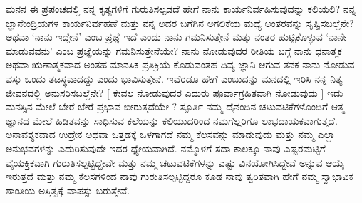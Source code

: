 ಮನನ 
 ಈ ಪ್ರಪಂಚದಲ್ಲಿ ನನ್ನ ಕೃತ್ಯಗಳಿಗೆ ಗುರುತಿಸಲ್ಪಡದೆ ಹೇಗೆ ನಾನು ಕಾರ್ಯನಿರ್ವಹಿಸುವುದನ್ನು ಕಲಿಯಲಿ? ನನ್ನ ಜ್ಞಾನೇಂದ್ರಿಯಗಳ ಕಾರ್ಯನಿರ್ವಹಣೆ ಮತ್ತು ನನ್ನ ಅದರ ಬಗೆಗಿನ ಅಗಲಿಕೆಯ ಮಧ್ಯೆ ಅಂತರವನ್ನು ಸೃಷ್ಟಿಸಬಲ್ಲೆನೇ? ಅಥವಾ ‘ನಾನು ಇದ್ದೇನೆ’ ಎಂಬ ಪ್ರಜ್ಞೆ ಇದೆ ಎಂದು ನಾನು ಗಮನಿಸುತ್ತೇನೆ ಮತ್ತು ನಂತರ ಹುಟ್ಟಿಕೊಳ್ಳುವ ‘ನಾನೇ ಮಾಡುವವನು’ ಎಂಬ ಪ್ರಜ್ಞೆಯನ್ನು ಗಮನಿಸುತ್ತೇನೆಯೇ? ನಾನು ನೋಡುವುದರ ರೀತಿಯ ಬಗ್ಗೆ ನಾನು ಧನಾತ್ಮಕ ಅಥವಾ ಋಣಾತ್ಮಕವಾದ ಅಂತಹ ಮಾನಸಿಕ ಪ್ರತಿಕ್ರಿಯೆ ಕೊಡುವಂತಹ ದಿವ್ಯ ಜ್ಞಾನಿ ಆಗುವ ತನಕ ನಾನು ನೋಡುವ ವಸ್ತು ಒಂದು ತಟಸ್ಥವಾದದ್ದು  ಎಂದು ಭಾವಿಸುತ್ತೇನೆ. ಇವೆರಡೂ ಹೇಗೆ ಎಂಬುದನ್ನು ಮನದಲ್ಲಿ ಇರಿಸಿ ನನ್ನ ನಿತ್ಯ ಜೀವನದಲ್ಲಿ ಅನುಸರಿಸಬಲ್ಲೆನೇ? [ ಕೇವಲ ನೋಡುವುದರ ಎದುರು ಪೂರ್ವಾಗ್ರಹಿತವಾಗಿ ನೋಡುವುದು ] ಇದು ಮನಸ್ಸಿನ ಮೇಲೆ ಬೇರೆ ಬೇರೆ ಪ್ರಭಾವ ಬೀರುತ್ತದೆಯೇ ?
 ಸ್ಪೂರ್ತಿ 
 ನಮ್ಮ ದೈನಂದಿನ ಚಟುವಟಿಕೆಗಳೊಂದಿಗೆ ಆತ್ಮ ಜ್ಞಾನದ ಮೇಲೆ ಹಿಡಿತವನ್ನು ಸಾಧಿಸುವ ಕಲೆಯನ್ನು ಕಲಿಯುದರಿಂದ ನಮಗೆಲ್ಲರಿಗೂ ಲಾಭದಾಯಕವಾಗುತ್ತದೆ. ಅನಾವಶ್ಯಕವಾದ ಉದ್ರೇಕ ಅಥವಾ ಒತ್ತಡಕ್ಕೆ ಒಳಗಾಗದೆ ನಮ್ಮ ಕೆಲಸವನ್ನು ಮಾಡುವುದು ಮತ್ತು ನಮ್ಮ ಎಲ್ಲಾ ಅನುಭವಗಳನ್ನು ಎದುರಿಸುವುದೇ ಇದರ ಧ್ಯೇಯವಾಗಿದೆ. ನಮ್ಮೊಳಗೆ ಸದಾ ಕಾಲಕ್ಕೂ ನಾವು ಎಷ್ಟರಮಟ್ಟಿಗೆ ವೈಯಕ್ತಿಕವಾಗಿ ಗುರುತಿಸಲ್ಪಟ್ಟಿದ್ದೇವೇ ಮತ್ತು ನಮ್ಮ ಚಟುವಟಿಕೆಗಳನ್ನು ಎಷ್ಟು ವಿನಯೋಗಿಸಿದ್ದೇವೆ ಅನ್ನುವ ಆಯ್ಕೆ ಇರುತ್ತದೆ ಮತ್ತು ನಮ್ಮ ಕೆಲಸಗಳಿಂದ ನಾವು ಗುರುತಿಸಲ್ಪಟ್ಟಿದ್ದರೂ ಕೂಡ ನಾವು ತ್ವರಿತವಾಗಿ ಹೇಗೆ ನಮ್ಮ ಸ್ವಾಭಾವಿಕ ಶಾಂತಿಯ ಅಸ್ತಿತ್ವಕ್ಕೆ ವಾಪಸ್ಸು ಬರುತ್ತೇವೆ.

